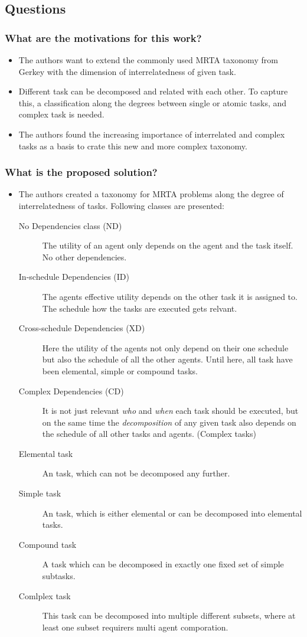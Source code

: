 \subsection*{Questions}
\subsubsection*{What are the motivations for this work?}
\begin{itemize}
    \item The authors want to extend the commonly used MRTA taxonomy from Gerkey \cite{Gerkey2004} with the dimension of interrelatedness of given task. 
    \item Different task can be decomposed and related with each other. To capture this, a classification along the degrees between single or atomic tasks, and complex task is needed.
    \item The authors found the increasing importance of interrelated and complex tasks as a basis to crate this new and more complex taxonomy.
\end{itemize}
\subsubsection*{What is the proposed solution?}
\begin{itemize}
  \item The authors created a taxonomy for MRTA problems along the degree of interrelatedness of tasks. Following classes are presented: \ 
  \begin{description}
      \item[No Dependencies class (ND)] The utility of an agent only depends on the agent and the task itself. No other dependencies. 
      \item[In-schedule Dependencies (ID)] The agents effective utility depends on the other task it is assigned to. The schedule how the tasks are executed gets relvant.
      \item[Cross-schedule Dependencies (XD)] Here the utility of the agents not only depend on their one schedule but also the schedule of all the other agents. Until here, all task have been elemental, simple or compound tasks.
      \item[Complex Dependencies (CD)] It is not just relevant \emph{who} and \emph{when} each task should be executed, but on the same time the \emph{decomposition} of any given task also depends on the schedule of all other tasks and agents. (Complex tasks)
      \item[Elemental task]  An task, which can not be decomposed any further.
      \item[Simple task]  An task, which is either elemental or can be decomposed into elemental tasks.
      \item[Compound task] A task which can be decomposed in exactly one fixed set of simple subtasks.
      \item[Comlplex task] This task can be decomposed into multiple different subsets, where at least one subset requirers multi agent comporation.
  \end{description}
\end{itemize}
